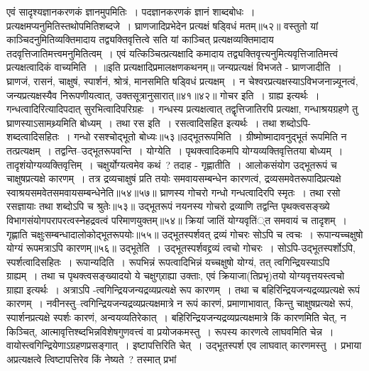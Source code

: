एवं सादृश्यज्ञानकरणकं ज्ञानमुपमितिः~।
पदज्ञानकरणकं ज्ञानं शाब्दबोधः~।
प्रत्यक्षमप्यनुमितिस्तथोपमितिशब्दजे~।
घ्राणजादिप्रभेदेन प्रत्यक्षं षड्विधं मतम्॥५२॥
वस्तुतो यां काञ्चिदनुमितिव्यक्तिमादाय तद्व्यक्तिवृत्तित्वे सति यां काञ्चित् प्रत्यक्षव्यक्तिमादाय तदवृत्तिजातिमत्त्वमनुमितित्वम्~। एवं यत्किञ्चित्प्रत्यक्षादि
कमादाय तद्व्यक्तिवृत्त्यनुमित्यवृत्तिजातिमत्त्वं प्रत्यक्षत्वादिकं वाच्यमिति~।
॥इति प्रत्यक्षादिप्रमालक्षणकथनम्॥
जन्यप्रत्यक्षं विभजते - घ्राणजादीति~। घ्राणजं, रासनं, चाक्षुषं, स्पार्शनं, श्रोत्रं, मानसमिति षड्विधं प्रत्यक्षम्~। न चेश्वरप्रत्यक्षस्याऽविभजनान्न्यूनत्वं, जन्यप्रत्यक्षस्यैव
निरूपणीयत्वात्, उक्तसूत्रानुसारात्॥४१॥४२॥
गोचर इति~। ग्राह्य इत्यर्थः~। गन्धत्वादिरित्यादिपदात् सुरभित्वादिपरिग्रहः~। गन्धस्य प्रत्यक्षत्वात् तद्वृत्तिजातिरपि प्रत्यक्षा, गन्धाश्रयग्रहणे तु घ्राणस्याऽसामथ्र्यमिति
बोध्यम्~।
तथा रस इति~। रसत्वादिसहित इत्यर्थः~।
तथा शब्दोऽपि-शब्दत्वादिसहितः~। गन्धो रसश्चोद्भूतो बोध्यः॥५३॥उद्भूतरूपमिति~। ग्रीष्मोष्मादावनुद्भूतं रूपमिति न तत्प्रत्यक्षम्~। तद्वन्ति--उद्भूतरूपवन्ति~।
योग्येति~। पृथक्त्वादिकमपि योग्यव्यक्तिवृत्तितया बोध्यम्~। तादृशंयोग्यव्यक्तिवृत्तिम्~। चक्षुर्योग्यत्वमेव कथं~? तदाह - गृह्णातीति~। आलोकसंयोग उद्भूतरूपं च
चाक्षुषप्रत्यक्षे कारणम्~। तत्र द्रव्यचाक्षुषं प्रति तयोः समवायसम्बन्धेन कारणत्वं, द्रव्यसमवेतरूपादिप्रत्यक्षे स्वाश्रयसमवेतसमवायसम्बन्धेनेति॥५४॥५७॥
घ्राणस्य गोचरो गन्धो गन्धत्वादिरपि स्मृतः~।
तथा रसो रसज्ञायाः तथा शब्दोऽपि च श्रुतेः॥५३॥
उद्भूतरूपं नयनस्य गोचरो द्रव्याणि तद्वन्ति पृथक्त्वसङ्ख्ये
विभागसंयोगपरापरत्वस्नेहद्रवत्वं परिमाणयुक्तम्॥५४॥
क्रियां जातिं योग्यवृतिं्त समवायं च तादृशम्~।
गृह्णाति चक्षुःसम्बन्धादालोकोद्भूतरूपयोः॥५५॥
उद्भूतस्पर्शवत् द्रव्यं गोचरः सोऽपि च त्वचः~।
रूपान्यच्चक्षुषो योग्यं रूपमत्राऽपि कारणम्॥५६॥
उद्भूतेति~। उद्भूतस्पर्शवद्द्रव्यं त्वचो गोचरः~। सोऽपि-उद्भूतस्पर्शोऽपि, स्पर्शत्वादिसहितः~। रूपान्यदिति~। रूपभिन्नं रूपत्वादिभिन्नं यच्चक्षुषो योग्यं, तत्
त्वगिन्द्रियस्याऽपि ग्राह्यम्~। तथा च पृथक्त्वसङ्ख्यादयो ये चक्षुग्र्राह्या उक्ताः, एवं क्रियाजा(तिप्रभृ)तयो योग्यवृत्तयस्त्वचो ग्राह्या इत्यर्थः~।
अत्राऽपि -त्वगिन्द्रियजन्यद्रव्यप्रत्यक्षे रूप कारणम्~। तथा च बहिरिन्द्रियजन्यद्रव्यप्रत्यक्षे रूपं कारणम्~।
नवीनस्तु--त्वगिन्द्रियजन्यद्रव्यप्रत्यक्षमात्रे न रूपं कारणं, प्रमाणाभावात्, किन्तु चाक्षुषप्रत्यक्षे रूपं, स्पार्शनप्रत्यक्षे स्पर्शः कारणं, अन्वयव्यतिरेकात्~।
बहिरिन्द्रियजन्यद्रव्यप्रत्यक्षमात्रे किं कारणमिति चेत्, न किञ्चित्, आत्मावृत्तिश्ब्दभिन्नविशेषगुणवत्त्वं वा प्रयोजकमस्तु~। रूपस्य कारणत्वे लाघवमिति चेन्न~।
वायोस्त्वगिन्द्रियेणाऽग्रहणप्रसङ्गात्~। इष्टापत्तिरिति चेत्~। उद्भूतस्पर्श एव लाघवात् कारणमस्तु~। प्रभाया अप्रत्यक्षत्वे त्विष्टापत्तिरेव किं नेष्यते~? तस्मात् प्रभां
